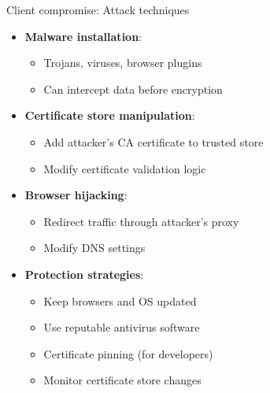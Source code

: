 \documentclass[aspectratio=169, lualatex, handout]{beamer}
\begin{document}
\begin{frame}{Client compromise: Attack techniques}
	\begin{itemize}[<+->]
		\item \textbf{Malware installation}:
		      \begin{itemize}
			      \item Trojans, viruses, browser plugins
			      \item Can intercept data before encryption
		      \end{itemize}
		\item \textbf{Certificate store manipulation}:
		      \begin{itemize}
			      \item Add attacker's CA certificate to trusted store
			      \item Modify certificate validation logic
		      \end{itemize}
		\item \textbf{Browser hijacking}:
		      \begin{itemize}
			      \item Redirect traffic through attacker's proxy
			      \item Modify DNS settings
		      \end{itemize}
		\item \textbf{Protection strategies}:
		      \begin{itemize}
			      \item Keep browsers and OS updated
			      \item Use reputable antivirus software
			      \item Certificate pinning (for developers)
			      \item Monitor certificate store changes
		      \end{itemize}
	\end{itemize}
\end{frame}
\end{document}

